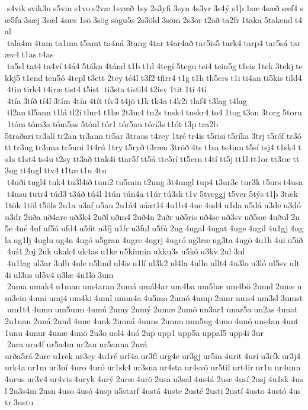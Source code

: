 s4vik svik3u s5vin s1vo s2væ 1svæð 1sy 2s3yfi 3syn 4s3yr 3s4ý s1þ 1sæ 4sæð sæf4 sæ5fa 3sæj 3sæl 4sæs 1sö 3sög sögu5s 2s3öld 3söm 2s3ör t2að ta2fr 1taka 5takend t4al  tala4m 4tam ta1ma t5amt ta4ná 3tang 4tar t4ar4að tar5is5 tark4 tarp4 tar5sá taræv4 t1as t4as  ta5sl tat4 ta4ví t4á4 5tákn 4tánd t1b t1d 4tegí 5tegu tei4 tein5g t1eis 1tek 3tekj tekkj5 t1end ten5ó 4tepl t3ett 2tey té4l t3f2 tfirr4 t1g t1h th5ers t1i ti4an ti5kis tild4 4tin tirk4 t4iræ tist4 t5ist  ti3sta tistil4 t2isv 1tit 1tí 4tí  4tía 3tíð tí4l 3tím 4tín 4tít tív3 t4jö t1k tk4a t4k2i tlaf4 t3lag t4lag  tl2an tl5ann t1lá tl2i tlur4 t1læ 2t3m4 tn2s tnsk4 tnskr4 to4 1tog t3on 3torg 5toru 1tóm tóm3a tóm5as 5tónl tór1 tór5au tóri3s t1ót t3p tra2b 	5traðari tr3alí tr2an tr3ann tr5ar 3traus t4rey 1tré tr4is t5risi t5ríka 3trj t5róf tr3ótt tr3ug tr3una tr5uni 1t4rú 1try t5ryð t3ræn 3tröð 4ts t1sa ts4inn t5sí tsj4 t1sk4 ts1s t1st4 ts4u t2sy tt3að ttak4i ttar5f tt5á tte5rí tt5ern t4tí tt5j tt1l tt1or tt3ræ tt3ug tt4ugl ttv4 t1tæ t1u 4tu  t4uði tugl4 tuk4 tu3l4ið tum2 tu5min t2ung 3t4ungl tup4 t3ur3e tur3k t5urs t4usa t4usu tutr4 túd3 t3úð tú4l 1tún tún4a t1úr tú3sk t1v 5tveggj t5ver 5týs t1þ 3tæk 1tök 1töl t5öls 2u1a u3af u5au 2u1á4 uáætl4 4u1b4 4uc 4ud4 u1da u5dá u3de u3dó u3dr 2uða uð4are uð3k4 2uðl uðm4 2uð4n 2uðr uð5ris uð4se uð3sv uð5sæ 4uðul 2u5e 4ué 4uf uf5á ufd4 u5fit u3fj u1fr u3ful u5fú 2ug 4ugal 4ugat 4uge 4ugil 4u1gj 4ugla ug1lj 4uglu ug4n 4ugó u5gran 4ugre 4ugrj 4ugró ug3ræ ug3ta 4ugö 4u1h 4ui u5ið 4uí4 2uj 2uk ukak4 uk4as u1ke u5kinnin ukku3s u5kó u3kv 2ul 3ul  4u1lag ul3ar 3ulb 4ule u5lind ul4is u1lí ul3k2 ul4la 4ulln ullt4 4u3lo u3ló ul5sv ult4i ul3us ul5v4 u3læ 4u1lö 3um  2uma umak4 u1man um4aran 2umá umál4ar um4ba um5bæ um4bö 2umd 2ume um3ein 4umi umj4 um4ki 4uml umm4a 4u5mo 2umó 4ump 2umr ums4 um3sl 3umst  um1t4 4umu um5unn 4umú 2umy 2umý 2umæ 2umö un3ar1 unar5a un2as 4unat 2u1nau 2uná 2und 4une 4unk 2unná 4unns 2unnu unn5ug 4uno 4unó uns4an 4unt 1unu 4unur 4unæ 4unö 2u3o uol4 4uó 2up upp1 upp5a uppal5 upp4i 3ur  2ura ura4f ur5a4m ur2an ur5anna 2urá 	urða5rá 2ure u1rek ur3ey 4u1ré urf4a ur3fl urg4e ur3gj ur5in 4urit 4urí u3rík ur3j4 urk4a ur1m ur3ní 4uro 4uró ur1sk4 ur3sna ur4sta ur4svö ur5til urt4ir ur1u ur4unn 4urus ur3v4 ur4vis 4uryk 4urý 2uræ 4urö 2usa u3sal 4us4á 2use 4usí 2usj 4u1sk 4usl 2u3s4m 2usn 4uso 4usó 4usp u5starf 4ustá 4uste 2usté 2usti 2ustí 4usto 4ustó 4ustr 3ustu 